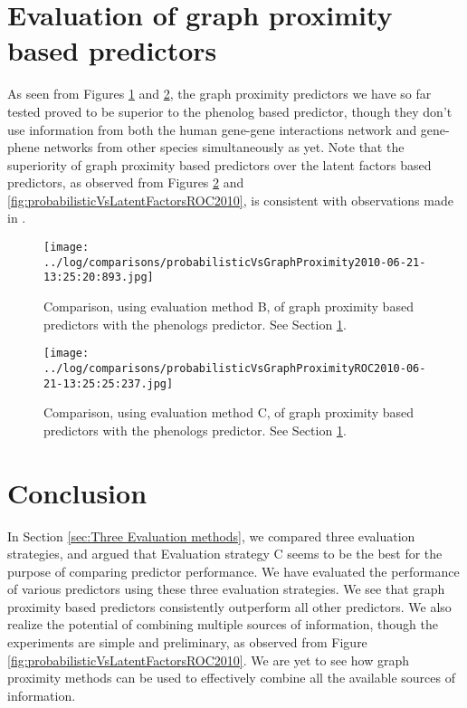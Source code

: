 \documentclass{article}
\begin{document}
\section{Evaluation of graph proximity based predictors}
\label{sec:Evaluation of graph proximity based predictors}
As seen from Figures \ref{fig:probabilisticVsGraphProximity2010} and \ref{fig:probabilisticVsGraphProximityROC2010}, the graph proximity predictors we have so far tested proved to be superior to the phenolog based predictor, though they don't use information from both the human gene-gene interactions network and gene-phene networks from other species simultaneously as yet. Note that the superiority of graph proximity based predictors over the latent factors based predictors, as observed from Figures \ref{fig:probabilisticVsGraphProximityROC2010} and \ref{fig:probabilisticVsLatentFactorsROC2010}, is consistent with observations made in \cite{vasukiNatarajan}.

\begin{figure}[h]
\texttt{[image: ../log/comparisons/probabilisticVsGraphProximity2010-06-21-13:25:20:893.jpg]}
\caption{Comparison, using evaluation method B, of graph proximity based predictors with the phenologs predictor. See Section \ref{sec:Evaluation of graph proximity based predictors}.}
\label{fig:probabilisticVsGraphProximity2010}
\end{figure}

\begin{figure}[h]
\texttt{[image: ../log/comparisons/probabilisticVsGraphProximityROC2010-06-21-13:25:25:237.jpg]}
\caption{Comparison, using evaluation method C, of graph proximity based predictors with the phenologs predictor. See Section \ref{sec:Evaluation of graph proximity based predictors}.}
\label{fig:probabilisticVsGraphProximityROC2010}
\end{figure}

\section{Conclusion}
In Section \ref{sec:Three Evaluation methods}, we compared three evaluation strategies, and argued that Evaluation strategy C seems to be the best for the purpose of comparing predictor performance. We have evaluated the performance of various predictors using these three evaluation strategies. We see that graph proximity based predictors consistently outperform all other predictors. We also realize the potential of combining multiple sources of information, though the experiments are simple and preliminary, as observed from Figure \ref{fig:probabilisticVsLatentFactorsROC2010}. We are yet to see how graph proximity methods can be used to effectively combine all the available sources of information.



\end{document}
